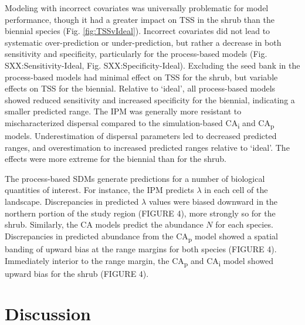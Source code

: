 \documentclass[preprint,review,times,12pt]{elsarticle}
\begin{document}
Modeling with incorrect covariates was universally problematic for model performance, though it had a greater impact on TSS in the shrub than the biennial species (Fig. \ref{fig:TSSvIdeal}). Incorrect covariates did not lead to systematic over-prediction or under-prediction, but rather a decrease in both sensitivity and specificity, particularly for the process-based models (Fig. SXX:Sensitivity-Ideal, Fig. SXX:Specificity-Ideal). Excluding the seed bank in the process-based models had minimal effect on TSS for the shrub, but variable effects on TSS for the biennial. Relative to ‘ideal’, all process-based models showed reduced sensitivity and increased specificity for the biennial, indicating a smaller predicted range. The IPM was generally more resistant to mischaracterized dispersal compared to the simulation-based CA\textsubscript{i} and CA\textsubscript{p} models. Underestimation of dispersal parameters led to decreased predicted ranges, and overestimation to increased predicted ranges relative to ‘ideal’. The effects were more extreme for the biennial than for the shrub.

The process-based SDMs generate predictions for a number of biological quantities of interest. For instance, the IPM predicts $\lambda$ in each cell of the landscape. Discrepancies in predicted $\lambda$ values were biased downward in the northern portion of the study region (FIGURE 4), more strongly so for the shrub. Similarly, the CA models predict the abundance $N$ for each species. Discrepancies in predicted abundance from the CA\textsubscript{p} model showed a spatial banding of upward bias at the range margins for both species (FIGURE 4). Immediately interior to the range margin, the CA\textsubscript{p} and CA\textsubscript{i} model showed upward bias for the shrub (FIGURE 4). 




\section{Discussion}
\label{S:4}

\end{document}
